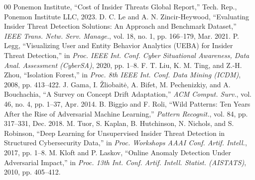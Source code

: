\documentclass[conference]{IEEEtran}
\begin{document}
\begin{thebibliography}{00}
 Ponemon Institute, ``Cost of Insider Threats Global Report,'' Tech. Rep., Ponemon Institute LLC, 2023.
 D. C. Le and A. N. Zincir-Heywood, ``Evaluating Insider Threat Detection Solutions: An Approach and Benchmark Dataset,'' \textit{IEEE Trans. Netw. Serv. Manage.}, vol. 18, no. 1, pp. 166--179, Mar. 2021.
 P. Legg, ``Visualizing User and Entity Behavior Analytics (UEBA) for Insider Threat Detection,'' in \textit{Proc. IEEE Int. Conf. Cyber Situational Awareness, Data Anal. Assessment (CyberSA)}, 2020, pp. 1--8.
 F. T. Liu, K. M. Ting, and Z.-H. Zhou, ``Isolation Forest,'' in \textit{Proc. 8th IEEE Int. Conf. Data Mining (ICDM)}, 2008, pp. 413--422.
 J. Gama, I. \v{Z}liobait\.{e}, A. Bifet, M. Pechenizkiy, and A. Bouchachia, ``A Survey on Concept Drift Adaptation,'' \textit{ACM Comput. Surv.}, vol. 46, no. 4, pp. 1--37, Apr. 2014.
 B. Biggio and F. Roli, ``Wild Patterns: Ten Years After the Rise of Adversarial Machine Learning,'' \textit{Pattern Recognit.}, vol. 84, pp. 317--331, Dec. 2018.
 M. Tuor, S. Kaplan, B. Hutchinson, N. Nichols, and S. Robinson, ``Deep Learning for Unsupervised Insider Threat Detection in Structured Cybersecurity Data,'' in \textit{Proc. Workshops AAAI Conf. Artif. Intell.}, 2017, pp. 1--8.
 M. Kloft and P. Laskov, ``Online Anomaly Detection Under Adversarial Impact,'' in \textit{Proc. 13th Int. Conf. Artif. Intell. Statist. (AISTATS)}, 2010, pp. 405--412.
\end{thebibliography}
\end{document}
